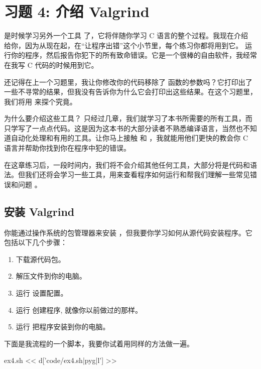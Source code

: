 \chapter{习题 4: 介绍 Valgrind}

是时候学习另外一个工具  了，它将伴随你学习 C 语言的整个过程。我现在介绍  给你，因为从现在起，在“让程序出错”这个小节里，每个练习你都将用到它。 运行你的程序，然后报告你犯下的所有致命错误。它是一个很棒的自由软件，我经常在我写 C 代码的时候用到它。

还记得在上一个习题里，我让你修改你的代码移除了  函数的参数吗？它打印出了一些不寻常的结果，但我没有告诉你为什么它会打印出这些结果。在这个习题里，我们将用  来探个究竟。

\begin{aside}{为什么要介绍这些工具？}
只经过几章，我们就学习了本书所需要的所有工具，而只学写了一点点代码。这是因为这本书的大部分读者不熟悉编译语言，当然也不知道自动化处理和有用的工具。让你马上接触   和  ，我就能用他们更快的教会你 C 语言并帮助你找到你在程序中犯的错误。

在这章练习后，一段时间内，我们将不会介绍其他任何工具，大部分将是代码和语法。但我们还将会学习一些工具，用来查看程序如何运行和帮我们理解一些常见错误和问题 。

\end{aside}

\section{安装 Valgrind}

 你能通过操作系统的包管理器来安装 ，但我要你学习如何从源代码安装程序。它包括以下几个步骤：

\begin{enumerate}
\item 下载源代码包。
\item 解压文件到你的电脑。
\item 运行  设置配置。
\item 运行  创建程序, 就像你以前做过的那样。
\item 运行  把程序安装到你的电脑。
\end{enumerate}

下面是我流程的一个脚本，我要你试着用同样的方法做一遍。

\begin{code}{ex4.sh}
<< d['code/ex4.sh|pyg|l'] >>
\end{code}

